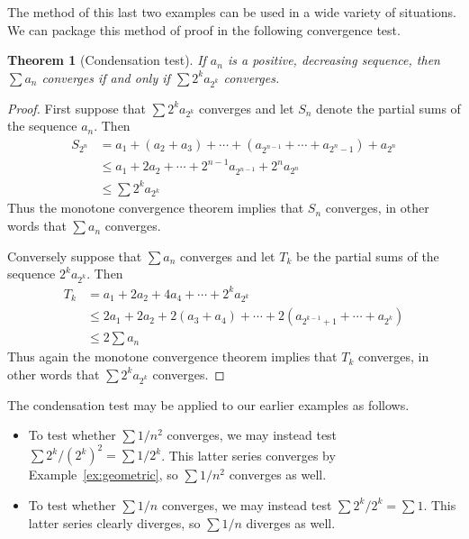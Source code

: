\documentclass[11pt,oneside]{amsbook}
\theoremstyle{definition}
\theoremstyle{plain}
\newtheorem{theorem}{Theorem}[section]
\theoremstyle{definition}
\theoremstyle{remark}
\numberwithin{equation}{section}
\numberwithin{figure}{section}
\begin{document}
The method of this last two examples can be used in a wide variety of situations. We can package this method of proof in the following convergence test.

\begin{theorem}[Condensation test]
  If $a_n$ is a positive, decreasing sequence, then $\sum a_n$ converges if and only if $\sum2^ka_{2^k}$ converges.
\end{theorem}


\begin{proof}
  First suppose that $\sum2^ka_{2^k}$ converges and let $S_n$ denote the partial sums of the sequence $a_n$. Then
  \begin{align*}
    S_{2^n}&=a_1+(a_2+a_3)+\cdots+(a_{2^{n-1}}+\cdots+a_{2^n-1})+a_{2^n}\\
           &\leq a_1+2a_2+\cdots+2^{n-1}a_{2^{n-1}}+2^na_{2^n}\\
           &\leq\sum2^ka_{2^k}
  \end{align*}
  Thus the monotone convergence theorem implies that $S_n$ converges, in other words that $\sum a_n$ converges.

  Conversely suppose that $\sum a_n$ converges and let $T_k$ be the partial sums of the sequence $2^ka_{2^k}$. Then
  \begin{align*}
    T_k&=a_1+2a_2+4a_4+\cdots+2^ka_{2^k}\\
       &\leq 2a_1+2a_2+2(a_3+a_4)+\cdots+2(a_{2^{k-1}+1}+\cdots+a_{2^k})\\
       &\leq 2\sum a_n
  \end{align*}
  Thus again the monotone convergence theorem implies that $T_k$ converges, in other words that $\sum2^ka_{2^k}$ converges.
\end{proof}

The condensation test may be applied to our earlier examples as follows.
\begin{itemize}
\item To test whether $\sum1/n^2$ converges, we may instead test $\sum2^k/(2^k)^2=\sum1/2^k$. This latter series converges by Example~\ref{ex:geometric}, so $\sum1/n^2$ converges as well.
\item To test whether $\sum1/n$ converges, we may instead test $\sum2^k/2^k=\sum1$. This latter series clearly diverges, so $\sum1/n$ diverges as well.
\end{itemize}

\end{document}
